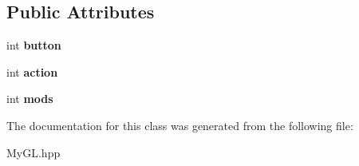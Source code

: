 \subsection*{Public Attributes}
\begin{DoxyCompactItemize}
\item 
\hypertarget{classMouseButton_ada6d6e1d81eaedf7092a8617af6ede6b}{}int {\bfseries button}\label{classMouseButton_ada6d6e1d81eaedf7092a8617af6ede6b}

\item 
\hypertarget{classMouseButton_a7f22ddcecc4bfe282f7c8b150e28704b}{}int {\bfseries action}\label{classMouseButton_a7f22ddcecc4bfe282f7c8b150e28704b}

\item 
\hypertarget{classMouseButton_a1fa333819593583ccc090db9330018ad}{}int {\bfseries mods}\label{classMouseButton_a1fa333819593583ccc090db9330018ad}

\end{DoxyCompactItemize}


The documentation for this class was generated from the following file\+:\begin{DoxyCompactItemize}
\item 
My\+G\+L.\+hpp\end{DoxyCompactItemize}
